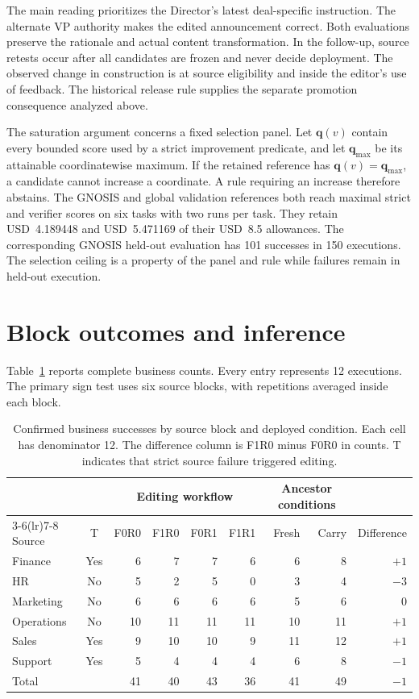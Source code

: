 \documentclass{ecai}
\begin{document}
The main reading prioritizes the Director's latest deal-specific instruction. The alternate VP authority makes the edited announcement correct. Both evaluations preserve the rationale and actual content transformation. In the follow-up, source retests occur after all candidates are frozen and never decide deployment. The observed change in construction is at source eligibility and inside the editor's use of feedback. The historical release rule supplies the separate promotion consequence analyzed above.

The saturation argument concerns a fixed selection panel. Let $\mathbf q(v)$ contain every bounded score used by a strict improvement predicate, and let $\mathbf q_{\max}$ be its attainable coordinatewise maximum. If the retained reference has $\mathbf q(v)=\mathbf q_{\max}$, a candidate cannot increase a coordinate. A rule requiring an increase therefore abstains. The GNOSIS and global validation references both reach maximal strict and verifier scores on six tasks with two runs per task. They retain USD~4.189448 and USD~5.471169 of their USD~8.5 allowances. The corresponding GNOSIS held-out evaluation has 101 successes in 150 executions. The selection ceiling is a property of the panel and rule while failures remain in held-out execution.

\section{Block outcomes and inference}

Table~\ref{tab:blocks} reports complete business counts. Every entry represents 12 executions. The primary sign test uses six source blocks, with repetitions averaged inside each block.

\begin{table}[t]
\centering
\caption{Confirmed business successes by source block and deployed condition. Each cell has denominator 12. The difference column is F1R0 minus F0R0 in counts. T indicates that strict source failure triggered editing.}
\label{tab:blocks}
\small
\renewcommand{\arraystretch}{1.16}
\begin{tabular*}{\textwidth}{@{\extracolsep{\fill}}lcrrrrrrr@{}}
\toprule
& & \multicolumn{4}{c}{Editing workflow} & \multicolumn{2}{c}{Ancestor conditions} & \\
\cmidrule(lr){3-6}\cmidrule(lr){7-8}
Source & T & F0R0 & F1R0 & F0R1 & F1R1 & Fresh & Carry & Difference\\
\midrule
Finance & Yes & 6 & 7 & 7 & 6 & 6 & 8 & $+1$\\
HR & No & 5 & 2 & 5 & 0 & 3 & 4 & $-3$\\
Marketing & No & 6 & 6 & 6 & 6 & 5 & 6 & $0$\\
Operations & No & 10 & 11 & 11 & 11 & 10 & 11 & $+1$\\
Sales & Yes & 9 & 10 & 10 & 9 & 11 & 12 & $+1$\\
Support & Yes & 5 & 4 & 4 & 4 & 6 & 8 & $-1$\\
\midrule
Total & & 41 & 40 & 43 & 36 & 41 & 49 & $-1$\\
\bottomrule
\end{tabular*}
\end{table}
\end{document}
